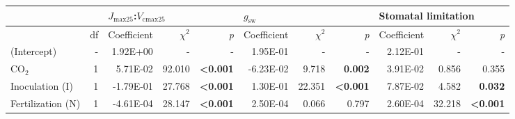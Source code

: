 \begin{landscape}
\begin{table}
{\begin{tabular}{p{3cm}p{0.5cm}p{1.75cm}p{1.5cm}p{1.5cm}p{1.75cm}p{1.5cm}p{1.5cm}p{1.75cm}p{1.5cm}p{1.5cm}}
            && \multicolumn{3}{l}{$J_{\mathrm{max25}}$:$V_\mathrm{cmax25}$} 
            &  \multicolumn{3}{l}{$g_{\mathrm{sw}}$}
            &  \multicolumn{3}{l}{Stomatal limitation}
            \\
            \hline
            & \multicolumn{1}{r}{df}
            & \multicolumn{1}{r}{Coefficient}   & \multicolumn{1}{r}{$\chi^{2}$}    & \multicolumn{1}{r}{\textit{p}}
            & \multicolumn{1}{r}{Coefficient}   & \multicolumn{1}{r}{$\chi^{2}$}    & \multicolumn{1}{r}{\textit{p}} 
            & \multicolumn{1}{r}{Coefficient}   & \multicolumn{1}{r}{$\chi^{2}$}    & \multicolumn{1}{r}{\textit{p}}  
            \\
            \hline

            (Intercept) & \multicolumn{1}{r}{-}
            & \multicolumn{1}{r}{1.92E+00}      & \multicolumn{1}{r}{-}             & \multicolumn{1}{r}{-}
            & \multicolumn{1}{r}{1.95E-01}      & \multicolumn{1}{r}{-}             & \multicolumn{1}{r}{-}
            & \multicolumn{1}{r}{2.12E-01}      & \multicolumn{1}{r}{-}             & \multicolumn{1}{r}{-}
            \\

            CO$_2$ & \multicolumn{1}{r}{1}
            & \multicolumn{1}{r}{ 5.71E-02}     & \multicolumn{1}{r}{92.010}        & \multicolumn{1}{r}{\textbf{<0.001}}
            & \multicolumn{1}{r}{-6.23E-02}     & \multicolumn{1}{r}{9.718}         & \multicolumn{1}{r}{\textbf{ 0.002}}
            & \multicolumn{1}{r}{ 3.91E-02}     & \multicolumn{1}{r}{0.856}         & \multicolumn{1}{r}{0.355} 
            \\

            Inoculation (I) & \multicolumn{1}{r}{1}
            & \multicolumn{1}{r}{-1.79E-01}     & \multicolumn{1}{r}{27.768}        & \multicolumn{1}{r}{\textbf{<0.001}}
            & \multicolumn{1}{r}{ 1.30E-01}     & \multicolumn{1}{r}{22.351}        & \multicolumn{1}{r}{\textbf{<0.001}}
            & \multicolumn{1}{r}{ 7.87E-02}     & \multicolumn{1}{r}{4.582}         & \multicolumn{1}{r}{\textbf{ 0.032}} 
            \\

            Fertilization (N) & \multicolumn{1}{r}{1}
            & \multicolumn{1}{r}{-4.61E-04}     & \multicolumn{1}{r}{28.147}        & \multicolumn{1}{r}{\textbf{<0.001}}
            & \multicolumn{1}{r}{ 2.50E-04}     & \multicolumn{1}{r}{0.066}         & \multicolumn{1}{r}{0.797}
            & \multicolumn{1}{r}{ 2.60E-04}     & \multicolumn{1}{r}{32.218}        & \multicolumn{1}{r}{\textbf{<0.001}} 
            \\


\end{tabular}}
\end{table}
\end{landscape}
